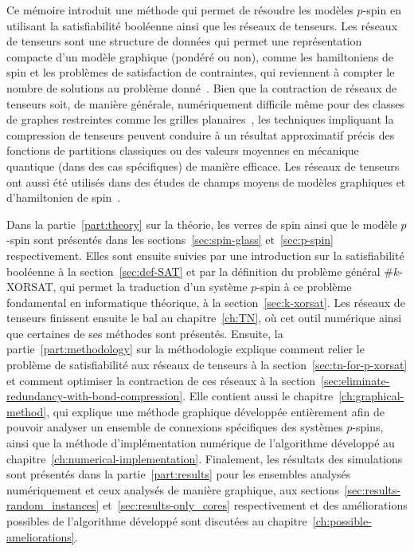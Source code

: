 Ce mémoire introduit une méthode qui permet de résoudre les modèles $p$-spin en utilisant la satisfiabilité booléenne ainsi que les réseaux de tenseurs.
Les réseaux de tenseurs sont une structure de données qui permet une représentation compacte d'un modèle graphique (pondéré ou non), comme les hamiltoniens de spin et les problèmes de satisfaction de contraintes, qui reviennent à compter le nombre de solutions au problème donné~\cite{garcia-saez_exact_2011, biamonte2015tensor, kourtis_fast_2019, Meichanetzidis_2019, de_beaudrap_tensor_2021}.
Bien que la contraction de réseaux de tenseurs soit, de manière générale, numériquement difficile même pour des classes de graphes restreintes comme les grilles planaires~\cite{schuch2007computational}, les techniques impliquant la compression de tenseurs peuvent conduire à un résultat approximatif précis des fonctions de partitions classiques ou des valeurs moyennes en mécanique quantique (dans des cas spécifiques) de manière efficace.
Les réseaux de tenseurs ont aussi été utilisés dans des études de champs moyens de modèles graphiques et d'hamiltonien de spin~\cite{alkabetz2021tensor, pancotti2023one}.

Dans la partie~\ref{part:theory} sur la théorie, les verres de spin ainsi que le modèle $p$-spin sont présentés dans les sections~\ref{sec:spin-glass} et~\ref{sec:p-spin} respectivement.
Elles sont ensuite suivies par une introduction sur la satisfiabilité booléenne à la section~\ref{sec:def-SAT} et par la définition du problème général \#$k$-XORSAT, qui permet la traduction d'un système $p$-spin à ce problème fondamental en informatique théorique, à la section~\ref{sec:k-xorsat}.
Les réseaux de tenseurs finissent ensuite le bal au chapitre~\ref{ch:TN}, où cet outil numérique ainsi que certaines de ses méthodes sont présentés.
Ensuite, la partie~\ref{part:methodology} sur la méthodologie explique comment relier le problème de satisfiabilité aux réseaux de tenseurs à la section~\ref{sec:tn-for-p-xorsat} et comment optimiser la contraction de ces réseaux à la section~\ref{sec:eliminate-redundancy-with-bond-compression}.
Elle contient aussi le chapitre~\ref{ch:graphical-method}, qui explique une méthode graphique développée entièrement afin de pouvoir analyser un ensemble de connexions spécifiques des systèmes $p$-spins, ainsi que la méthode d'implémentation numérique de l'algorithme développé au chapitre~\ref{ch:numerical-implementation}.
Finalement, les résultats des simulations sont présentés dans la partie~\ref{part:results} pour les ensembles analysés numériquement et ceux analysés de manière graphique, aux sections~\ref{sec:results-random_instances} et~\ref{sec:results-only_cores} respectivement et des améliorations possibles de l'algorithme développé sont discutées au chapitre~\ref{ch:possible-ameliorations}.

